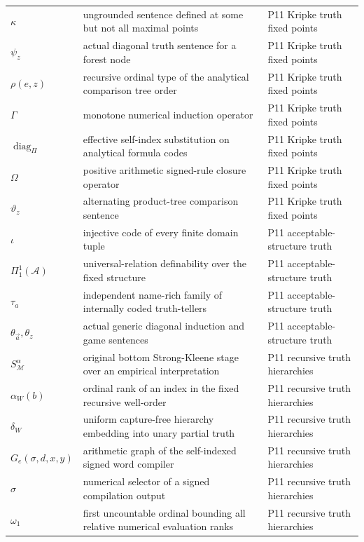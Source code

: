 \begin{longtable}{@{}p{}p{}p{}@{}}
\(\kappa\) & ungrounded sentence defined at some but not all maximal points & P11 Kripke truth fixed points \\
\(\psi_z\) & actual diagonal truth sentence for a forest node & P11 Kripke truth fixed points \\
\(\rho(e,\allowbreak z)\) & recursive ordinal type of the analytical comparison tree order & P11 Kripke truth fixed points \\
\(\Gamma\) & monotone numerical induction operator & P11 Kripke truth fixed points \\
\(\operatorname{diag}_{\Pi}\) & effective self-index substitution on analytical formula codes & P11 Kripke truth fixed points \\
\(\Omega\) & positive arithmetic signed-rule closure operator & P11 Kripke truth fixed points \\
\(\vartheta_z\) & alternating product-tree comparison sentence & P11 Kripke truth fixed points \\
\(\iota\) & injective code of every finite domain tuple & P11 acceptable-\allowbreak{}structure truth \\
\(\Pi^1_1(\mathcal A)\) & universal-relation definability over the fixed structure & P11 acceptable-\allowbreak{}structure truth \\
\(\tau_a\) & independent name-rich family of internally coded truth-tellers & P11 acceptable-\allowbreak{}structure truth \\
\(\theta_{\vec a},\allowbreak \theta_z\) & actual generic diagonal induction and game sentences & P11 acceptable-\allowbreak{}structure truth \\
\(S_{\mathcal M}^{\alpha}\) & original bottom Strong-Kleene stage over an empirical interpretation & P11 recursive truth hierarchies \\
\(\alpha_W(b)\) & ordinal rank of an index in the fixed recursive well-order & P11 recursive truth hierarchies \\
\(\delta_W\) & uniform capture-free hierarchy embedding into unary partial truth & P11 recursive truth hierarchies \\
\(G_e(\sigma,\allowbreak d,\allowbreak x,\allowbreak y)\) & arithmetic graph of the self-indexed signed word compiler & P11 recursive truth hierarchies \\
\(\sigma\) & numerical selector of a signed compilation output & P11 recursive truth hierarchies \\
\(\omega_1\) & first uncountable ordinal bounding all relative numerical evaluation ranks & P11 recursive truth hierarchies \\

\end{longtable}
